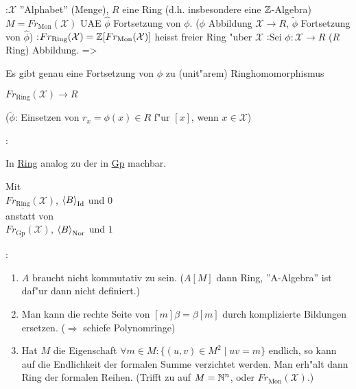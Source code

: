 \example{}:{$\mathcal{X}$ ''Alphabet'' (Menge), $R$ eine Ring (d.h. insbesondere eine $\mathbb Z$-Algebra)
 $M=Fr_{\operatorname{Mon}}(\mathcal{X})$ UAE
 $\hat\phi$ Fortsetzung von $\phi$. ($\phi$ Abbildung $\mathcal{X}\longrightarrow R$,
 $\tilde{\phi}$ Fortsetzung von $\hat\phi$)}
:{$Fr_{\operatorname{Ring}}(\mathcal{X})=
 \mathbb Z[Fr_{\operatorname{Mon}}(\mathcal{X})]$ heisst freier Ring "uber $\mathcal{X}$
}
:{Sei $\phi:\mathcal{X}\longrightarrow R$ ($R$ Ring) Abbildung.}
 =>{Es gibt genau eine Fortsetzung von $\phi$ zu (unit"arem) Ringhomomorphismus

 $Fr_{\operatorname{Ring}}(\mathcal{X})\longrightarrow R$

 ($\tilde{\phi}$: Einsetzen von $r_x=\phi(x)\in R$ f"ur $[x]$, wenn $x\in \mathcal{X}$)
}
:{In \underline{Ring} analog zu der in
 \underline{Gp} machbar.

 Mit \\
 $Fr_{\operatorname{\underline{Ring}}}(\mathcal{X})$, 
 ${\left\langle B\right\rangle}_{\operatorname{Id}}$ und
 $0$ \\ 
 anstatt von \\ 
 $Fr_{\operatorname{\underline{Gp}}}(\mathcal{X})$, 
 ${\left\langle B\right\rangle}_{\operatorname{Nor}}$ und
 $1$       
 }
:{
 \begin{enumerate}
 \item $A$ braucht nicht kommutativ zu sein. ($A[M]$ dann Ring,
 ''A-Algebra'' ist daf"ur dann nicht definiert.)
 \item Man kann die rechte Seite von $[m]\beta=\beta[m]$ durch komplizierte Bildungen ersetzen.
 ($\Rightarrow$ schiefe Polynomringe)
 \item Hat $M$ die Eigenschaft $\forall m\in M: \{(u,v)\in M^2 \mid uv=m\}$ endlich, so kann
 auf die Endlichkeit der formalen Summe verzichtet werden. Man erh"alt dann Ring der formalen Reihen.
 (Trifft zu auf $M=\mathbb N^n$, oder $Fr_{\operatorname{Mon}}(\mathcal{X})$.)
 \end{enumerate}}
